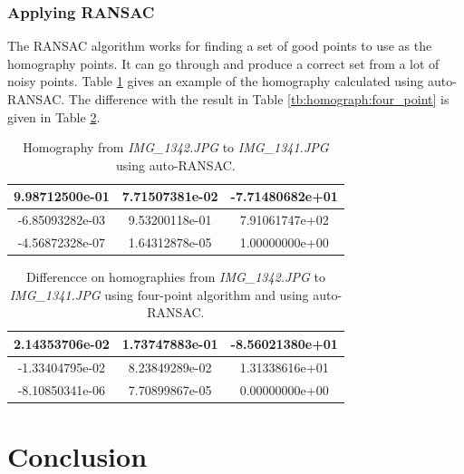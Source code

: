 \documentclass[paper=a4, fontsize=11pt]{scrartcl}
\begin{document}
\subsubsection{Applying RANSAC}
The RANSAC algorithm works for finding a set of good points to use as the homography points.
It can go through and produce a correct set from a lot of noisy points.
Table \ref{tb:homograph:auto_ransac} gives an example of the homography calculated using auto-RANSAC.
The difference with the result in Table \ref{tb:homograph:four_point} is given in Table \ref{tb:homograph:auto_ransac:error}.

\begin{table}
	\caption{Homography from \emph{IMG\_1342.JPG} to \emph{IMG\_1341.JPG} using auto-RANSAC.}
	\label{tb:homograph:auto_ransac}
	\begin{center}
		\begin{tabular}{|c|c|c|}
			\hline
			9.98712500e-01 & 7.71507381e-02 & -7.71480682e+01\\
			\hline
			-6.85093282e-03 &  9.53200118e-01 &  7.91061747e+02\\
			\hline
			-4.56872328e-07 &  1.64312878e-05 &  1.00000000e+00\\
			\hline
		\end{tabular}
	\end{center}
\end{table}

\begin{table}
	\caption{Differencce on homographies from \emph{IMG\_1342.JPG} to \emph{IMG\_1341.JPG} using four-point algorithm and using auto-RANSAC.}
	\label{tb:homograph:auto_ransac:error}
	\begin{center}
		\begin{tabular}{|c|c|c|}
			\hline
			2.14353706e-02 &  1.73747883e-01 &  -8.56021380e+01\\
			\hline
			-1.33404795e-02 &  8.23849289e-02 &  1.31338616e+01\\
			\hline
			-8.10850341e-06 &  7.70899867e-05 &  0.00000000e+00\\
			\hline
		\end{tabular}
	\end{center}
\end{table}

\section{Conclusion}
\end{document}
